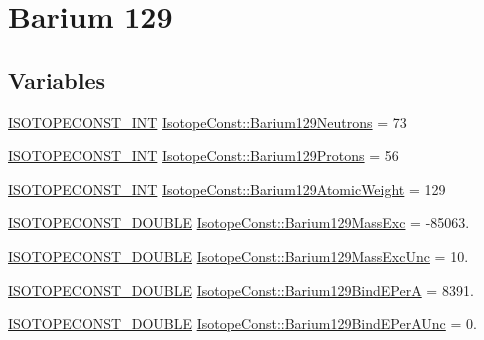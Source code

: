 \hypertarget{group___isotope_const-_barium-_ba129}{}\section{Barium 129}
\label{group___isotope_const-_barium-_ba129}
\subsection*{Variables}
\begin{DoxyCompactItemize}
\item 
\mbox{\hyperlink{group___isotope_const-_macros_ga5f18360b3e99483a35c32d789e62621c}{I\+S\+O\+T\+O\+P\+E\+C\+O\+N\+S\+T\+\_\+\+I\+NT}} \mbox{\hyperlink{group___isotope_const-_barium-_ba129_gae15519909cb4c568e0daea8c1bcedefb}{Isotope\+Const\+::\+Barium129\+Neutrons}} = 73
\item 
\mbox{\hyperlink{group___isotope_const-_macros_ga5f18360b3e99483a35c32d789e62621c}{I\+S\+O\+T\+O\+P\+E\+C\+O\+N\+S\+T\+\_\+\+I\+NT}} \mbox{\hyperlink{group___isotope_const-_barium-_ba129_ga4210bcb2ff4aa901527f578d4b51129a}{Isotope\+Const\+::\+Barium129\+Protons}} = 56
\item 
\mbox{\hyperlink{group___isotope_const-_macros_ga5f18360b3e99483a35c32d789e62621c}{I\+S\+O\+T\+O\+P\+E\+C\+O\+N\+S\+T\+\_\+\+I\+NT}} \mbox{\hyperlink{group___isotope_const-_barium-_ba129_ga7953daae185bb6171a01a2b7df9f637d}{Isotope\+Const\+::\+Barium129\+Atomic\+Weight}} = 129
\item 
\mbox{\hyperlink{group___isotope_const-_macros_ga8f45a7272ce02c0b4c65c44636ed719a}{I\+S\+O\+T\+O\+P\+E\+C\+O\+N\+S\+T\+\_\+\+D\+O\+U\+B\+LE}} \mbox{\hyperlink{group___isotope_const-_barium-_ba129_ga3674a3a51a68f7717b92707d5f637de1}{Isotope\+Const\+::\+Barium129\+Mass\+Exc}} = -\/85063.
\item 
\mbox{\hyperlink{group___isotope_const-_macros_ga8f45a7272ce02c0b4c65c44636ed719a}{I\+S\+O\+T\+O\+P\+E\+C\+O\+N\+S\+T\+\_\+\+D\+O\+U\+B\+LE}} \mbox{\hyperlink{group___isotope_const-_barium-_ba129_gae778c534722a66a1ecf60815b785c733}{Isotope\+Const\+::\+Barium129\+Mass\+Exc\+Unc}} = 10.
\item 
\mbox{\hyperlink{group___isotope_const-_macros_ga8f45a7272ce02c0b4c65c44636ed719a}{I\+S\+O\+T\+O\+P\+E\+C\+O\+N\+S\+T\+\_\+\+D\+O\+U\+B\+LE}} \mbox{\hyperlink{group___isotope_const-_barium-_ba129_ga4fe498ec26d95554c19fa6c2c8263e50}{Isotope\+Const\+::\+Barium129\+Bind\+E\+PerA}} = 8391.
\item 
\mbox{\hyperlink{group___isotope_const-_macros_ga8f45a7272ce02c0b4c65c44636ed719a}{I\+S\+O\+T\+O\+P\+E\+C\+O\+N\+S\+T\+\_\+\+D\+O\+U\+B\+LE}} \mbox{\hyperlink{group___isotope_const-_barium-_ba129_ga320ff5d7889c2c7f4e42cbc6e57c83b8}{Isotope\+Const\+::\+Barium129\+Bind\+E\+Per\+A\+Unc}} = 0.

\end{DoxyCompactItemize}

